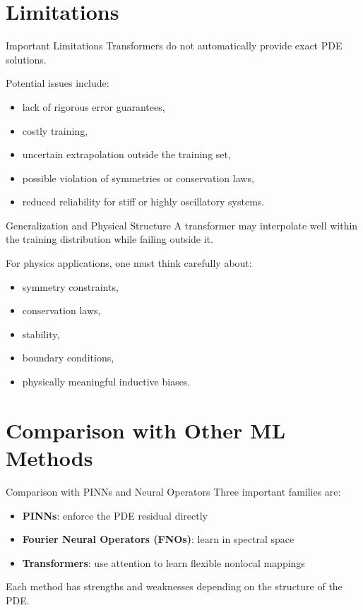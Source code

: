 \documentclass{beamer}
\begin{document}
\section{Limitations}

\begin{frame}{Important Limitations}
Transformers do not automatically provide exact PDE solutions.

Potential issues include:
\begin{itemize}
\item lack of rigorous error guarantees,
\item costly training,
\item uncertain extrapolation outside the training set,
\item possible violation of symmetries or conservation laws,
\item reduced reliability for stiff or highly oscillatory systems.
\end{itemize}
\end{frame}


\begin{frame}{Generalization and Physical Structure}
A transformer may interpolate well within the training distribution while failing outside it.

\medskip

For physics applications, one must think carefully about:
\begin{itemize}
\item symmetry constraints,
\item conservation laws,
\item stability,
\item boundary conditions,
\item physically meaningful inductive biases.
\end{itemize}
\end{frame}

\section{Comparison with Other ML Methods}

\begin{frame}{Comparison with PINNs and Neural Operators}
Three important families are:

\begin{itemize}
\item \textbf{PINNs}: enforce the PDE residual directly
\item \textbf{Fourier Neural Operators (FNOs)}: learn in spectral space
\item \textbf{Transformers}: use attention to learn flexible nonlocal mappings
\end{itemize}

Each method has strengths and weaknesses depending on the structure of the PDE.
\end{frame}
\end{document}
